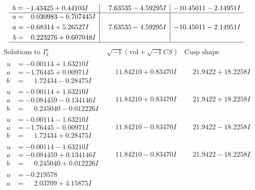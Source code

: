 \documentclass[1p]{elsarticle_modified}
\theoremstyle{definition}
\newcommand{\I}{\sqrt{-1}}
\begin{document}
$$\begin{array}{c|c|c}
\begin{aligned}
b &= -1.43425 + 0.44103 I\end{aligned}
 & \phantom{-}7.63535 - 4.59295 I & -10.45011 - 2.14951 I \\ \hline\begin{aligned}
u &= \phantom{-}0.030983 - 0.707445 I \\
a &= -0.68314 + 5.26527 I \\
b &= \phantom{-}0.223276 + 0.607048 I\end{aligned}
 & \phantom{-}7.63535 - 4.59295 I & -10.45011 - 2.14951 I\\
 \hline 
 \end{array}$$\newpage$$\begin{array}{c|c|c}  
\text{Solutions to }I^u_{3}& \I (\text{vol} + \sqrt{-1}CS) & \text{Cusp shape}\\
 \hline 
\begin{aligned}
u &= -0.00114 + 1.63210 I \\
a &= -1.76445 + 0.00971 I \\
b &= \phantom{-}1.72434 - 0.28475 I\end{aligned}
 & \phantom{-}11.84210 + 0.83470 I & \phantom{-}21.9422 + 18.2258 I \\ \hline\begin{aligned}
u &= -0.00114 + 1.63210 I \\
a &= -0.084459 - 0.134146 I \\
b &= \phantom{-}0.245040 - 0.012226 I\end{aligned}
 & \phantom{-}11.84210 + 0.83470 I & \phantom{-}21.9422 + 18.2258 I \\ \hline\begin{aligned}
u &= -0.00114 - 1.63210 I \\
a &= -1.76445 - 0.00971 I \\
b &= \phantom{-}1.72434 + 0.28475 I\end{aligned}
 & \phantom{-}11.84210 - 0.83470 I & \phantom{-}21.9422 - 18.2258 I \\ \hline\begin{aligned}
u &= -0.00114 - 1.63210 I \\
a &= -0.084459 + 0.134146 I \\
b &= \phantom{-}0.245040 + 0.012226 I\end{aligned}
 & \phantom{-}11.84210 - 0.83470 I & \phantom{-}21.9422 - 18.2258 I \\ \hline\begin{aligned}
u &= -0.219578\phantom{ +0.000000I} \\
a &= \phantom{-}2.03709 + 4.15875 I \\

\end{aligned}
\end{array}$$
\end{document}
